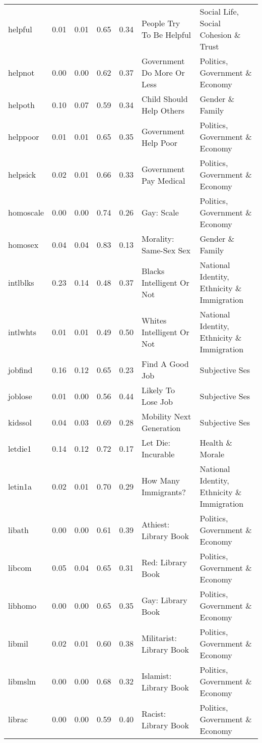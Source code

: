 \begin{longtable}{l|rrrrll}
helpful & 0.01 & 0.01 & 0.65 & 0.34 & People Try To Be Helpful & Social Life, Social Cohesion \& Trust \\ 
helpnot & 0.00 & 0.00 & 0.62 & 0.37 & Government Do More Or Less & Politics, Government \& Economy \\ 
helpoth & 0.10 & 0.07 & 0.59 & 0.34 & Child Should Help Others & Gender \& Family \\ 
helppoor & 0.01 & 0.01 & 0.65 & 0.35 & Government Help Poor & Politics, Government \& Economy \\ 
helpsick & 0.02 & 0.01 & 0.66 & 0.33 & Government Pay Medical & Politics, Government \& Economy \\ 
homoscale & 0.00 & 0.00 & 0.74 & 0.26 & Gay: Scale & Politics, Government \& Economy \\ 
homosex & 0.04 & 0.04 & 0.83 & 0.13 & Morality: Same-Sex Sex & Gender \& Family \\ 
intlblks & 0.23 & 0.14 & 0.48 & 0.37 & Blacks Intelligent Or Not & National Identity, Ethnicity \& Immigration \\ 
intlwhts & 0.01 & 0.01 & 0.49 & 0.50 & Whites Intelligent Or Not & National Identity, Ethnicity \& Immigration \\ 
jobfind & 0.16 & 0.12 & 0.65 & 0.23 & Find A Good Job & Subjective Ses \\ 
joblose & 0.01 & 0.00 & 0.56 & 0.44 & Likely To Lose Job & Subjective Ses \\ 
kidssol & 0.04 & 0.03 & 0.69 & 0.28 & Mobility Next Generation & Subjective Ses \\ 
letdie1 & 0.14 & 0.12 & 0.72 & 0.17 & Let Die: Incurable & Health \& Morale \\ 
letin1a & 0.02 & 0.01 & 0.70 & 0.29 & How Many Immigrants? & National Identity, Ethnicity \& Immigration \\ 
libath & 0.00 & 0.00 & 0.61 & 0.39 & Athiest: Library Book & Politics, Government \& Economy \\ 
libcom & 0.05 & 0.04 & 0.65 & 0.31 & Red: Library Book & Politics, Government \& Economy \\ 
libhomo & 0.00 & 0.00 & 0.65 & 0.35 & Gay: Library Book & Politics, Government \& Economy \\ 
libmil & 0.02 & 0.01 & 0.60 & 0.38 & Militarist: Library Book & Politics, Government \& Economy \\ 
libmslm & 0.00 & 0.00 & 0.68 & 0.32 & Islamist: Library Book & Politics, Government \& Economy \\ 
librac & 0.00 & 0.00 & 0.59 & 0.40 & Racist: Library Book & Politics, Government \& Economy \\ 

\end{longtable}
